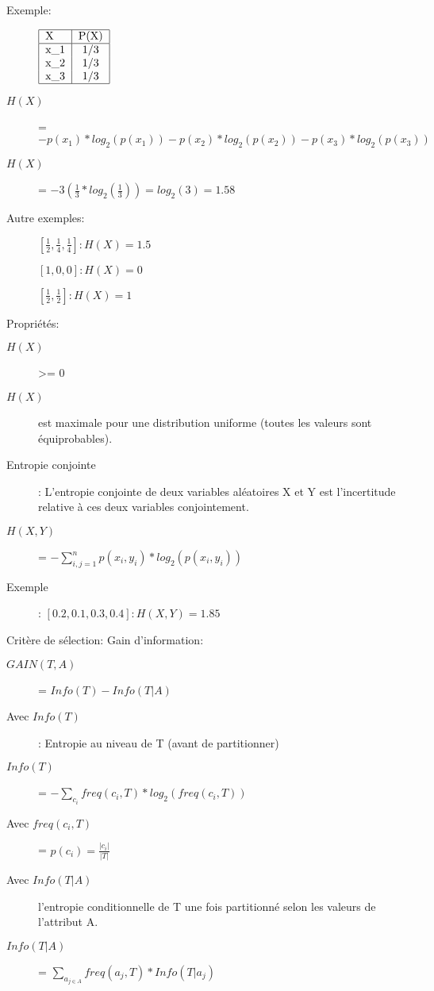 Exemple:
\begin{description}
\item[] $\begin{tabular}{|l|c|r|}
  \hline
   X & P(X)\\
  \hline
  x\_1 & 1/3 \\
  x\_2 & 1/3 \\
  x\_3 & 1/3 \\
  \hline
\end{tabular}$
\item[$H(X)$] = $-p(x_1)*log_2(p(x_1))-p(x_2)*log_2(p(x_2))-p(x_3)*log_2(p(x_3))$
\item[$H(X)$] = $-3(\frac{1}{3}*log_2(\frac{1}{3})) = log_2(3) = 1.58$
\end{description}

Autre exemples:
\begin{description}
\item[] $[\frac{1}{2}, \frac{1}{4}, \frac{1}{4}]: H(X) = 1.5$
\item[] $[1, 0, 0]: H(X) = 0$
\item[] $[\frac{1}{2}, \frac{1}{2}]: H(X) = 1$
\end{description}

Propriétés:
\begin{description}
\item[$H(X)$] >= 0
\item[$H(X)$] est maximale pour une distribution uniforme (toutes les valeurs sont équiprobables).
\end{description}

\begin{description}
\item[Entropie conjointe]: L’entropie conjointe de deux variables aléatoires X et Y est l’incertitude relative à ces deux variables conjointement.
\item[$H(X,Y)$] = $- \sum_{i,j=1}^n p(x_i,y_i) * log_2(p(x_i,y_i))$
\item[Exemple]: $[0.2, 0.1, 0.3, 0.4]: H(X,Y) = 1.85$
\end{description}


Critère de sélection: Gain d'information:
\begin{description}
\item[$GAIN(T,A)$] = $Info(T) - Info(T|A)$
\item[Avec $Info(T)$]: Entropie au niveau de T (avant de partitionner)
\item[$Info(T)$] = $-\sum_{c_i} freq(c_i,T)*log_2(freq(c_i,T))$
\item[Avec $freq(c_i,T)$] = $p(c_i) = \frac{|c_i|}{|T|}$
\item[Avec $Info(T|A)$] l'entropie conditionnelle de T une fois partitionné selon les valeurs de l'attribut A.
\item[$Info(T|A)$] = $ \sum_{a_{j \in A}} freq(a_j,T) * Info(T | a_j)$
\end{description}

